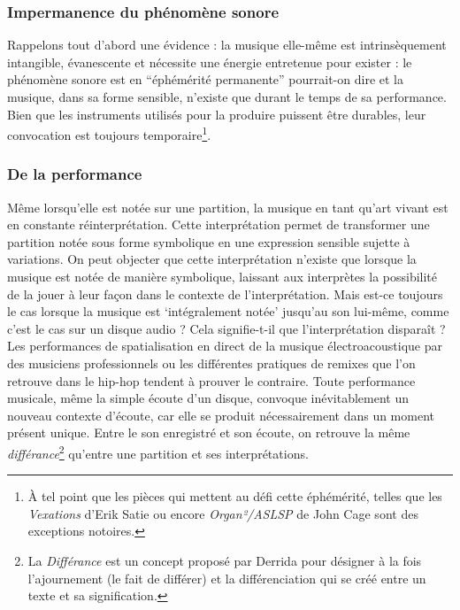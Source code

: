 \subsubsection{Impermanence du phénomène sonore}
\noindent Rappelons tout d'abord une évidence : la musique elle-même est intrinsèquement intangible, évanescente et nécessite une énergie entretenue pour exister : le phénomène sonore est en ``éphémérité permanente'' pourrait-on dire et la musique, dans sa forme sensible, n'existe que durant le temps de sa performance. Bien que les instruments utilisés pour la produire puissent être durables, leur convocation est toujours temporaire\footnote{À tel point que les pièces qui mettent au défi cette éphémérité, telles que les \textit{Vexations} d'Erik Satie ou encore \textit{Organ²/ASLSP} de John Cage sont des exceptions notoires.}.

\subsubsection{De la performance}

\noindent Même lorsqu'elle est notée sur une partition, la musique en tant qu'art vivant est en constante réinterprétation. Cette interprétation permet de transformer une partition notée sous forme symbolique en une expression sensible sujette à variations. On peut objecter que cette interprétation n'existe que lorsque la musique est notée de manière symbolique, laissant aux interprètes la possibilité de la jouer à leur façon dans le contexte de l'interprétation. Mais est-ce toujours le cas lorsque la musique est `intégralement notée' jusqu'au son lui-même, comme c'est le cas sur un disque audio ? Cela signifie-t-il que l'interprétation disparaît ? Les performances de spatialisation en direct de la musique électroacoustique par des musiciens professionnels ou les différentes pratiques de remixes que l'on retrouve dans le hip-hop tendent à prouver le contraire. Toute performance musicale, même la simple écoute d'un disque, convoque inévitablement un nouveau contexte d'écoute, car elle se produit nécessairement dans un moment présent unique. Entre le son enregistré et son écoute, on retrouve la même \textit{différance}\footnote{La \textit{Différance} est un concept proposé par Derrida \cite{derrida_lecriture_2014} pour désigner à la fois l'ajournement (le fait de différer) et la différenciation qui se créé entre un texte et sa signification.} qu'entre une partition et ses interprétations.

